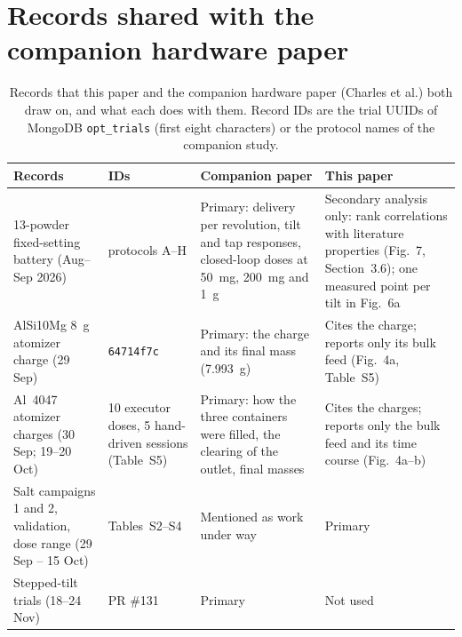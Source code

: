 \documentclass[11pt]{article}
\begin{document}
\section{Records shared with the companion hardware paper}

\begin{table}[h]
\centering
\caption{Records that this paper and the companion hardware paper (Charles et al.) both draw on, and what each
does with them. Record IDs are the trial UUIDs of MongoDB \texttt{opt\_trials} (first eight characters) or the
protocol names of the companion study.}
\label{tab:shared}
\footnotesize
\begin{tabularx}{\textwidth}{@{}p{3.3cm}p{2.7cm}XX@{}}
\toprule
Records & IDs & Companion paper & This paper \\
\midrule
13-powder fixed-setting battery (Aug--Sep 2026) & protocols A--H & Primary: delivery per revolution, tilt and tap responses, closed-loop doses at 50~mg, 200~mg and 1~g & Secondary analysis only: rank correlations with literature properties (Fig.~7, Section~3.6); one measured point per tilt in Fig.~6a \\
AlSi10Mg 8~g atomizer charge (29 Sep) & \texttt{64714f7c} & Primary: the charge and its final mass (7.993~g) & Cites the charge; reports only its bulk feed (Fig.~4a, Table~S5) \\
Al~4047 atomizer charges (30 Sep; 19--20 Oct) & 10 executor doses, 5 hand-driven sessions (Table~S5) & Primary: how the three containers were filled, the clearing of the outlet, final masses & Cites the charges; reports only the bulk feed and its time course (Fig.~4a--b) \\
Salt campaigns 1 and 2, validation, dose range (29 Sep -- 15 Oct) & Tables~S2--S4 & Mentioned as work under way & Primary \\
Stepped-tilt trials (18--24 Nov) & PR \#131 & Primary & Not used \\
\bottomrule
\end{tabularx}
\end{table}
\end{document}
